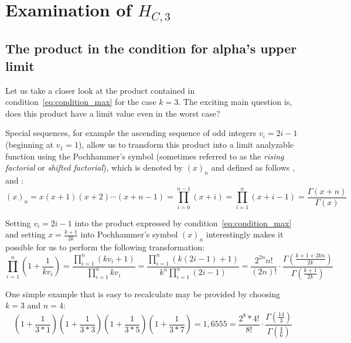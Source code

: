 \chapter{Examination of \boldmath$H_{C,3}$}

\section{The product in the condition for alpha's upper limit}
Let us take a closer look at the product contained in condition~\ref{eq:condition_max} for the case $k=3$. The exciting main question is, does this product have a limit value even in the worst case?

\par\medskip
Special sequences, for example the ascending sequence of odd integers $v_i=2i-1$ (beginning at $v_1=1$), allow us to transform this product into a limit analyzable function using the Pochhammer’s symbol (sometimes referred to as the \textit{rising factorial} or \textit{shifted factorial}), which is denoted by $(x)_n$ and defined as follows \cite{Ref_Zwillinger_Kokoska}, \cite[p.~679]{Ref_Brychkov} and \cite[p.~1005]{Ref_Trott}:
\[
(x)_n=x(x+1)(x+2)\cdots(x+n-1)=\prod_{i=0}^{n-1}(x+i)=\prod_{i=1}^{n}(x+i-1)=\frac{\Gamma(x+n)}{\Gamma(x)}
\]

Setting $v_i=2i-1$ into the product expressed by condition~\ref{eq:condition_max} and setting $x=\frac{k+1}{2k}$ into Pochhammer’s symbol $(x)_n$ interestingly makes it possible for us to perform the following transformation:
\[
\prod_{i=1}^{n}\left(1+\frac{1}{kv_i}\right)
=\frac{\prod_{i=1}^{n}(kv_i+1)}{\prod_{i=1}^{n}kv_i}
=\frac{\prod_{i=1}^{n}\left(k(2i-1)+1\right)}{k^n\prod_{i=1}^{n}(2i-1)}
=\frac{2^{2n}n!}{(2n)!}\cdot\frac{\Gamma\left(\frac{k+1+2kn}{2k}\right)}{\Gamma\left(\frac{k+1}{2k}\right)}
\]

\begin{example}
One simple example that is easy to recalculate may be provided by choosing $k=3$ and $n=4$:
\[
\left(1+\frac{1}{3*1}\right)\left(1+\frac{1}{3*3}\right)\left(1+\frac{1}{3*5}\right)\left(1+\frac{1}{3*7}\right)=1,6555=\frac{2^8*4!}{8!}\cdot\frac{\Gamma(\frac{14}{3})}{\Gamma(\frac{4}{6})}
\]
\end{example}


